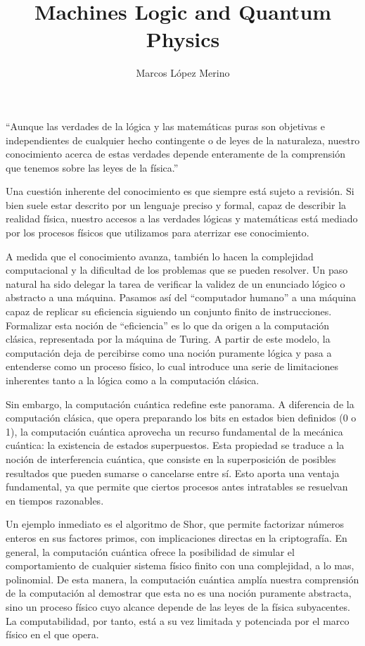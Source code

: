 \documentclass[digital, 11pt]{fc-hw-template}
\title{Machines Logic and Quantum Physics}
\author{Marcos López Merino}
\begin{document}
\maketitle

``Aunque las verdades de la lógica y las matemáticas puras son objetivas e independientes de cualquier hecho contingente o de leyes de la naturaleza, nuestro conocimiento acerca de estas verdades depende enteramente de la comprensión que tenemos sobre las leyes de la física.''\cite{deutschMachinesLogicQuantum1999}

Una cuestión inherente del conocimiento es que siempre está sujeto a revisión. Si bien suele estar descrito por un lenguaje preciso y formal, capaz de describir la realidad física, nuestro accesos a las verdades lógicas y matemáticas está mediado por los procesos físicos que utilizamos para aterrizar ese conocimiento.

A medida que el conocimiento avanza, también lo hacen la complejidad computacional y la dificultad de los problemas que se pueden resolver. Un paso natural ha sido delegar la tarea de verificar la validez de un enunciado lógico o abstracto a una máquina. Pasamos así del ``computador humano'' a una máquina capaz de replicar su eficiencia siguiendo un conjunto finito de instrucciones. Formalizar esta noción de ``eficiencia'' es lo que da origen a la computación clásica, representada por la máquina de Turing. A partir de este modelo, la computación deja de percibirse como una noción puramente lógica y pasa a entenderse como un proceso físico, lo cual introduce una serie de limitaciones inherentes tanto a la lógica como a la computación clásica.

Sin embargo, la computación cuántica redefine este panorama. A diferencia de la computación clásica, que opera preparando los bits en estados bien definidos (0 o 1), la computación cuántica aprovecha un recurso fundamental de la mecánica cuántica: la existencia de estados superpuestos. Esta propiedad se traduce a la noción de interferencia cuántica, que consiste en la superposición de posibles resultados que pueden sumarse o cancelarse entre sí. Esto aporta una ventaja fundamental, ya que permite que ciertos procesos antes intratables se resuelvan en tiempos razonables.

Un ejemplo inmediato es el algoritmo de Shor, que permite factorizar números enteros en sus factores primos, con implicaciones directas en la criptografía. En general, la computación cuántica ofrece la posibilidad de simular el comportamiento de cualquier sistema físico finito con una complejidad, a lo mas, polinomial. De esta manera, la computación cuántica amplía nuestra comprensión de la computación al demostrar que esta no es una noción puramente abstracta, sino un proceso físico cuyo alcance depende de las leyes de la física subyacentes. La computabilidad, por tanto, está a su vez limitada y potenciada por el marco físico en el que opera.
\end{document}
